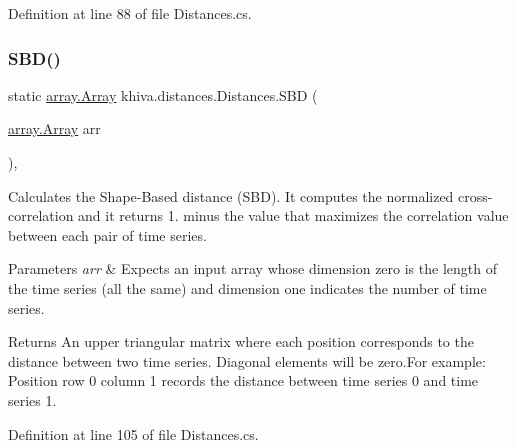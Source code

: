 Definition at line 88 of file Distances.\+cs.

\mbox{\label{classkhiva_1_1distances_1_1_distances_a5047a6e83a2e870929ab537e328dc306}} 
\subsubsection{\texorpdfstring{S\+B\+D()}{SBD()}}
{\footnotesize\ttfamily static \mbox{\hyperlink{classkhiva_1_1array_1_1_array}{array.\+Array}} khiva.\+distances.\+Distances.\+S\+BD (\begin{DoxyParamCaption}\item[{\mbox{\hyperlink{classkhiva_1_1array_1_1_array}{array.\+Array}}}]{arr }\end{DoxyParamCaption})\hspace{0.3cm}{\ttfamily [inline]}, {\ttfamily [static]}}



Calculates the Shape-\/\+Based distance (S\+BD). It computes the normalized cross-\/correlation and it returns 1. minus the value that maximizes the correlation value between each pair of time series. 


\begin{DoxyParams}{Parameters}
{\em arr} & Expects an input array whose dimension zero is the length of the time series (all the same) and dimension one indicates the number of time series.\\
\hline
\end{DoxyParams}
\begin{DoxyReturn}{Returns}
An upper triangular matrix where each position corresponds to the distance between two time series. Diagonal elements will be zero.\+For example\+: Position row 0 column 1 records the distance between time series 0 and time series 1.
\end{DoxyReturn}


Definition at line 105 of file Distances.\+cs.

\mbox{\label{classkhiva_1_1distances_1_1_distances_addaafe2d58ec05fbe00e7cbfbe5eef6c}} 
